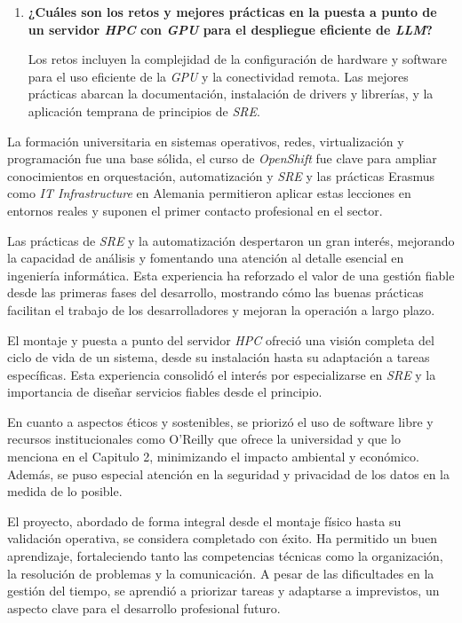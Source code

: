 \begin{enumerate}
    Estas prácticas son fundamentales para la robustez y operatividad del servidor, demostrando resiliencia (autoescalado, auto-healing) y simplificación operativa. Además, resultan muy útiles y fundamentales de cara a largo plazo.
    
    \newpage
    \item \textbf{¿Cuáles son los retos y mejores prácticas en la puesta a punto de un servidor \textit{HPC} con \textit{GPU} para el despliegue eficiente de \textit{LLM}?}
    
    Los retos incluyen la complejidad de la configuración de hardware y software para el uso eficiente de la \textit{GPU} y la conectividad remota. Las mejores prácticas abarcan la documentación, instalación de drivers y librerías, y la aplicación temprana de principios de \textit{SRE}.
\end{enumerate}

La formación universitaria en sistemas operativos, redes, virtualización y programación fue una base sólida, el curso de \textit{OpenShift} fue clave para ampliar conocimientos en orquestación, automatización y \textit{SRE} y las prácticas Erasmus como \textit{IT Infrastructure} en Alemania permitieron aplicar estas lecciones en entornos reales y suponen el primer contacto profesional en el sector.

Las prácticas de \textit{SRE} y la automatización despertaron un gran interés, mejorando la capacidad de análisis y fomentando una atención al detalle esencial en ingeniería informática. Esta experiencia ha reforzado el valor de una gestión fiable desde las primeras fases del desarrollo, mostrando cómo las buenas prácticas facilitan el trabajo de los desarrolladores y mejoran la operación a largo plazo.

El montaje y puesta a punto del servidor \textit{HPC} ofreció una visión completa del ciclo de vida de un sistema, desde su instalación hasta su adaptación a tareas específicas. Esta experiencia consolidó el interés por especializarse en \textit{SRE} y la importancia de diseñar servicios fiables desde el principio.

En cuanto a aspectos éticos y sostenibles, se priorizó el uso de software libre y recursos institucionales como O’Reilly que ofrece la universidad y que lo menciona en el Capitulo 2, minimizando el impacto ambiental y económico. Además, se puso especial atención en la seguridad y privacidad de los datos en la medida de lo posible. 

El proyecto, abordado de forma integral desde el montaje físico hasta su validación operativa, se considera completado con éxito. Ha permitido un buen aprendizaje, fortaleciendo tanto las competencias técnicas como la organización, la resolución de problemas y la comunicación. A pesar de las dificultades en la gestión del tiempo, se aprendió a priorizar tareas y adaptarse a imprevistos, un aspecto clave para el desarrollo profesional futuro.

